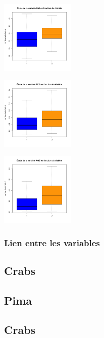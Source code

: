 \documentclass[10pt]{article}
\begin{document}
\begin{center}
\begin{minipage}[t]{0.3\textwidth}
	\end{minipage}
	\begin{minipage}[t]{0.3\textwidth}
		\includegraphics[width=35mm]{Figures/Pima/bxp_z_bmi.png}
	\end{minipage}
	\newline
	\begin{minipage}[t]{0.3\textwidth}
		\includegraphics[width=35mm]{Figures/Pima/bxp_z_ped.png}
	\end{minipage}
	\begin{minipage}[t]{0.3\textwidth}
		\includegraphics[width=35mm]{Figures/Pima/bxp_z_age.png}
	\end{minipage}
\end{center}

\subsubsection{Lien entre les variables}


\subsection{Crabs}

\subsection{Pima}

\subsection{Crabs}
\end{document}
